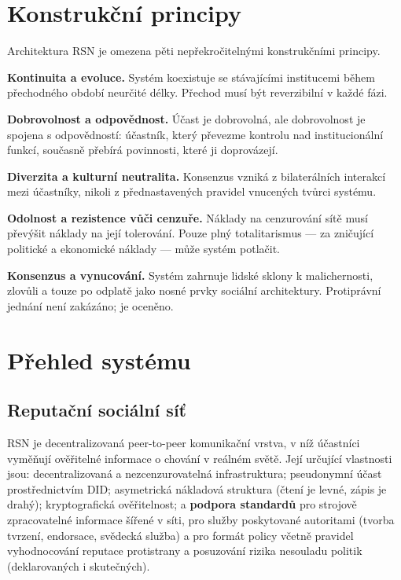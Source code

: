 \documentclass[11pt,a4paper,twocolumn]{article}
\begin{document}
\section{Konstrukční principy}

Architektura RSN je omezena pěti nepřekročitelnými konstrukčními principy.

\textbf{Kontinuita a evoluce.} Systém koexistuje se stávajícími institucemi během přechodného období neurčité délky. Přechod musí být reverzibilní v každé fázi.

\textbf{Dobrovolnost a odpovědnost.} Účast je dobrovolná, ale dobrovolnost je spojena s odpovědností: účastník, který převezme kontrolu nad institucionální funkcí, současně přebírá povinnosti, které ji doprovázejí.

\textbf{Diverzita a kulturní neutralita.} Konsenzus vzniká z bilaterálních interakcí mezi účastníky, nikoli z přednastavených pravidel vnucených tvůrci systému.

\textbf{Odolnost a rezistence vůči cenzuře.} Náklady na cenzurování sítě musí převýšit náklady na její tolerování. Pouze plný totalitarismus --- za zničující politické a ekonomické náklady --- může systém potlačit.

\textbf{Konsenzus a vynucování.} Systém zahrnuje lidské sklony k malichernosti, zlovůli a touze po odplatě jako nosné prvky sociální architektury. Protiprávní jednání není zakázáno; je oceněno.

\section{Přehled systému}

\subsection{Reputační sociální síť}

RSN je decentralizovaná peer-to-peer komunikační vrstva, v níž účastníci vyměňují ověřitelné informace o chování v reálném světě. Její určující vlastnosti jsou: decentralizovaná a nezcenzurovatelná infrastruktura; pseudonymní účast prostřednictvím DID; asymetrická nákladová struktura (čtení je levné, zápis je drahý); kryptografická ověřitelnost; a \textbf{podpora standardů} pro strojově zpracovatelné informace šířené v síti, pro služby poskytované autoritami (tvorba tvrzení, endorsace, svědecká služba) a pro formát policy včetně pravidel vyhodnocování reputace protistrany a posuzování rizika nesouladu politik (deklarovaných i skutečných).
\end{document}
